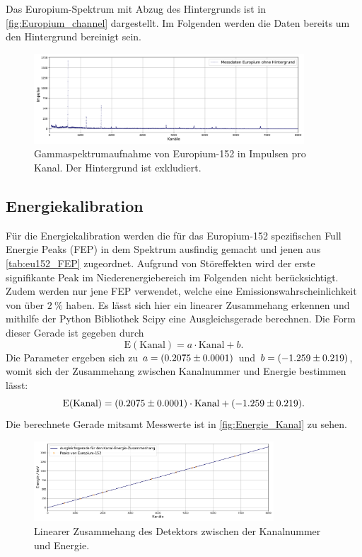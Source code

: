 Das Europium-Spektrum mit Abzug des Hintergrunds ist in \autoref{fig:Europium_channel} dargestellt. Im Folgenden werden die Daten bereits um den Hintergrund bereinigt sein.

\begin{figure}
    \centering
    \includegraphics[width = 0.9\textwidth]{plots/europium_channel.pdf}
    \caption{Gammaspektrumaufnahme von Europium-152 in Impulsen pro Kanal. Der Hintergrund ist exkludiert.}
    \label{fig:Europium_channel}
\end{figure}

\subsection{Energiekalibration}

Für die Energiekalibration werden die für das Europium-152 spezifischen Full Energie Peaks (FEP) in dem Spektrum ausfindig gemacht und jenen aus \autoref{tab:eu152_FEP} zugeordnet. Aufgrund von Störeffekten
wird der erste signifikante Peak im Niederenergiebereich im Folgenden nicht berücksichtigt. Zudem werden nur jene FEP verwendet, welche eine Emissionswahrscheinlichkeit von über $\qty{2}{\%}$ haben.
Es lässt sich hier ein linearer Zusammehang erkennen und mithilfe der Python Bibliothek Scipy \cite{scipy} eine Ausgleichsgerade berechnen. Die Form dieser Gerade ist gegeben durch
\begin{equation}
    \mathrm{E(Kanal)} = a \cdot \mathrm{Kanal} + b.
\end{equation}
Die Parameter ergeben sich zu $a = \qty{0.2075 \pm 0.0001}{}$ und $b = \qty{-1.259 \pm 0.219}{}$, womit sich der Zusammehang zwischen Kanalnummer und Energie bestimmen lässt:
\begin{equation}
    \mathrm{E(Kanal)} = \qty{0.2075 \pm 0.0001}{} \cdot \mathrm{Kanal} + \qty{-1.259 \pm 0.219}{}.
\end{equation}
Die berechnete Gerade mitsamt Messwerte ist in \autoref{fig:Energie_Kanal} zu sehen.

\begin{figure}
    \centering
    \includegraphics[width = 0.8\textwidth]{plots/energy_channel.pdf}
    \caption{Linearer Zusammehang des Detektors zwischen der Kanalnummer und Energie.}
    \label{fig:Energie_Kanal}
\end{figure}

